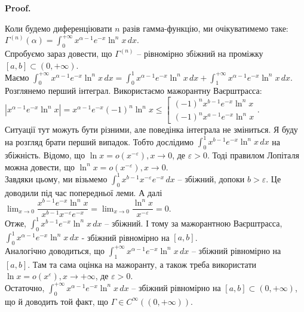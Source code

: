 \documentclass[a4paper, 10pt]{article}
\makeatletter
\def\huge{\displaystyle}
\def\qed{$\blacksquare$}
\theoremstyle{theoremdd}
\theoremstyle{theoremdd}
\theoremstyle{theoremdd}
\theoremstyle{theoremdd}
\theoremstyle{theoremdd}
\theoremstyle{theoremdd}
\theoremstyle{theoremdd}
\theoremstyle{theoremdd}
\theoremstyle{theoremdd}
\renewenvironment{proof}[1][Proof.\\]{\par
\pushQED{\hfill \qed}%
\normalfont \topsep6\p@\@plus6\p@\relax
\trivlist
\item\relax
{\bfseries
#1\@addpunct{.}}\hspace\labelsep\ignorespaces
}{%
\popQED\endtrivlist\@endpefalse
}
\makeatother
\begin{document}
\begin{proof}
Коли будемо диференціювати $n$ разів гамма-функцію, ми очікуватимемо таке:\\
$\Gamma^{(n)}(\alpha) = \huge\int_0^{+\infty} x^{\alpha-1}e^{-x} \ln^n x\,dx$.\\
Спробуємо зараз довести, що $\Gamma^{(n)}$ -- рівномірно збіжний на проміжку $[a,b] \subset (0,+\infty)$.\\
Маємо $\huge\int_0^{+\infty} x^{\alpha-1}e^{-x} \ln^n x\,dx = \huge\int_0^{1} x^{\alpha-1}e^{-x} \ln^n x\,dx + \huge\int_1^{+\infty} x^{\alpha-1}e^{-x} \ln^n x\,dx$.\\
Розглянемо перший інтеграл. Використаємо мажорантну Ваєрштрасса:\\
$|x^{\alpha-1}e^{-x} \ln^n x| = x^{\alpha-1}e^{-x} (-1)^n \ln^n x \leq \left[ \begin{gathered} (-1)^n x^{b-1}e^{-x}\ln^n x \\ (-1)^n x^{a-1}e^{-x}\ln^n x \end{gathered} \right.$.\\
Ситуації тут можуть бути різними, але поведінка інтеграла не зміниться. Я буду на розгляд брати перший випадок. Тобто дослідимо $\huge\int_0^{1} x^{b-1}e^{-x}\ln^n x\,dx$ на збіжність. Відомо, що $\ln x = o(x^{-\varepsilon}), x \to 0$, де $\varepsilon > 0$. Тоді правилом Лопіталя можна довести, що $\ln^n x = o(x^{-\varepsilon}), x \to 0$.\\
Завдяки цьому, ми візьмемо $\huge\int_0^1 x^{b-1} x^{-\varepsilon} e^{-x}\,dx$ -- збіжний, допоки $b > \varepsilon$. Це доводили під час попередньої леми. А далі $\huge\lim_{x \to 0} \dfrac{x^{b-1}e^{-x} \ln^n x}{x^{b-1} x^{-\varepsilon} e^{-x}} = \lim_{x \to 0} \dfrac{\ln^n x}{x^{-\varepsilon}} = 0$.\\
Отже, $\huge\int_0^{1} x^{b-1}e^{-x} \ln^n x\,dx$ -- збіжний. І тому за мажорантною Ваєрштрасса, $\huge\int_0^1 x^{\alpha-1}e^{-x} \ln^n x\,dx$ - збіжний рівномірно на $[a,b]$.
\\
Аналогічно доводиться, що $\huge\int_1^{+\infty} x^{\alpha-1} e^{-x}\ln^n x\,dx$ -- збіжний рівномірно на $[a,b]$. Там та сама оцінка на мажоранту, а також треба використати $\ln x = o(x^{\varepsilon}), x \to +\infty$, де $\varepsilon >0$.\\ 
Остаточно, $\huge\int_0^{+\infty} x^{\alpha-1}e^{-x} \ln^n x\,dx$ -- збіжний рівномірно на $[a,b] \subset (0,+\infty)$, що й доводить той факт, що $\Gamma \in C^{\infty}((0,+\infty))$.
\end{proof}
\end{document}
